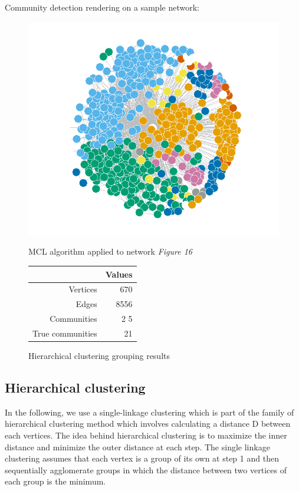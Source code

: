 \documentclass[11pt]{article}       %
\begin{document}
Community detection rendering on a sample network:
\begin{figure}[H]
\centering
\begin{minipage}[b]{0.47\linewidth}
\centering
\includegraphics[width=0.9\linewidth]{zNetworkMCL_2.PNG}
\caption{MCL algorithm applied to network \textit{Figure 16}}
\end{minipage}
\hspace{0.5cm}
\begin{minipage}[b]{0.45\linewidth}
\captionsetup{type=table}
\centering
\begin{tabular}[b]{rr}
  \hline
 & Values \\ 
  \hline
  Vertices & 670 \\ 
   Edges & 8556 \\
  Communities & 2 5\\ 
  True communities & 21 \\ 
   \hline
\end{tabular}
\vspace{2cm}
\caption{Hierarchical clustering grouping results}
\end{minipage}
\end{figure}

\subsection{Hierarchical clustering}
In the following, we use a single-linkage clustering \cite{wikiMCL} which is part of the family of hierarchical clustering method which involves calculating a distance D between each vertices. The idea behind hierarchical clustering is to maximize the inner distance and minimize the outer distance at each step. The single linkage clustering assumes that each vertex is a group of its own at step 1 and then sequentially agglomerate groups in which the distance between two vertices of each group is the minimum. 
\end{document}
